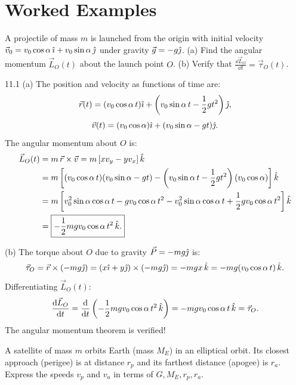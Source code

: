\section{Worked Examples}

\begin{worked}
A projectile of mass $m$ is launched from the origin with initial velocity $\vec{v}_0 = v_0\cos\alpha\,\hat{\imath} + v_0\sin\alpha\,\hat{\jmath}$ under gravity $\vec{g} = -g\hat{\jmath}$.
(a) Find the angular momentum $\vec{L}_O(t)$ about the launch point $O$.
(b) Verify that $\frac{\dd\vec{L}_O}{\dd t} = \vec{\tau}_O(t)$.
\end{worked}

\begin{solution}{11.1}
(a) The position and velocity as functions of time are:
\[
\vec{r}(t) = (v_0\cos\alpha\,t)\hat{\imath} + \left(v_0\sin\alpha\,t - \frac{1}{2}gt^2\right)\hat{\jmath},
\]
\[
\vec{v}(t) = (v_0\cos\alpha)\hat{\imath} + (v_0\sin\alpha - gt)\hat{\jmath}.
\]
The angular momentum about $O$ is:
\begin{align*}
\vec{L}_O(t) &= m\,\vec{r}\times\vec{v} = m\left[ x v_y - y v_x \right]\hat{k} \\
&= m\left[ (v_0\cos\alpha\,t)(v_0\sin\alpha - gt) - \left(v_0\sin\alpha\,t - \frac{1}{2}gt^2\right)(v_0\cos\alpha) \right]\hat{k} \\
&= m\left[ v_0^2\sin\alpha\cos\alpha\,t - g v_0\cos\alpha\,t^2 - v_0^2\sin\alpha\cos\alpha\,t + \frac{1}{2}g v_0\cos\alpha\,t^2 \right]\hat{k} \\
&= \boxed{-\frac{1}{2}m g v_0\cos\alpha\,t^2\,\hat{k}.}
\end{align*}

(b) The torque about $O$ due to gravity $\vec{P} = -mg\hat{\jmath}$ is:
\[
\vec{\tau}_O = \vec{r}\times(-mg\hat{\jmath}) = (x\hat{\imath} + y\hat{\jmath})\times(-mg\hat{\jmath}) = -mgx\,\hat{k} = -mg(v_0\cos\alpha\,t)\,\hat{k}.
\]
Differentiating $\vec{L}_O(t)$:
\[
\frac{\mathrm{d}\vec{L}_O}{\mathrm{d} t} = \frac{\mathrm{d}}{\mathrm{d} t}\left(-\frac{1}{2}mgv_0\cos\alpha\,t^2\,\hat{k}\right) = -mgv_0\cos\alpha\,t\,\hat{k} = \vec{\tau}_O.
\]
The angular momentum theorem is verified!
\end{solution}

\begin{worked}
A satellite of mass $m$ orbits Earth (mass $M_E$) in an elliptical orbit. Its closest approach (perigee) is at distance $r_p$ and its farthest distance (apogee) is $r_a$. Express the speeds $v_p$ and $v_a$ in terms of $G, M_E, r_p, r_a$.
\end{worked}

